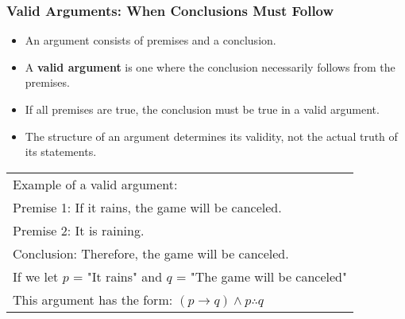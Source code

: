 \documentclass{beamer}
\begin{document}
                            \begin{frame}
                            \frametitle{Valid Arguments: When Conclusions Must Follow}
                            \begin{itemize}
                                \item An argument consists of premises and a conclusion.
                                \item A \textbf{valid argument} is one where the conclusion necessarily follows from the premises.
                                \item If all premises are true, the conclusion must be true in a valid argument.
                                \item The structure of an argument determines its validity, not the actual truth of its statements.
                            \end{itemize}
                            
                            \begin{center}
                                \scriptsize
                            \begin{tabular}{|p{}|}
                            \hline
                            Example of a valid argument:\\[0.2cm]
                            Premise 1: If it rains, the game will be canceled.\\
                            Premise 2: It is raining.\\
                            Conclusion: Therefore, the game will be canceled.\\[0.3cm]
                            If we let $p$ = "It rains" and $q$ = "The game will be canceled"\\
                            This argument has the form: $(p \rightarrow q) \wedge p \therefore q$\\
                            \hline
                            \end{tabular}
                            \end{center}
                            \end{frame}
                            
\end{document}
